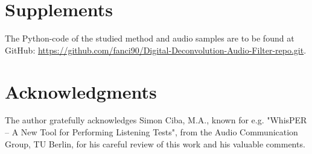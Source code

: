 \documentclass{article}
\begin{document}

\section{Supplements}
The Python-code of the studied method and audio samples are to be found at GitHub: \href{https://github.com/fanci90/Digital-Deconvolution-Audio-Filter-repo.git}{https://github.com/fanci90/Digital-Deconvolution-Audio-Filter-repo.git}.


\section*{Acknowledgments}
The author gratefully acknowledges Simon Ciba, M.A., known for e.g. "WhisPER – A New Tool for Performing Listening Tests", from the Audio Communication Group, TU Berlin, for his careful review of this work and his valuable comments.
\end{document}
